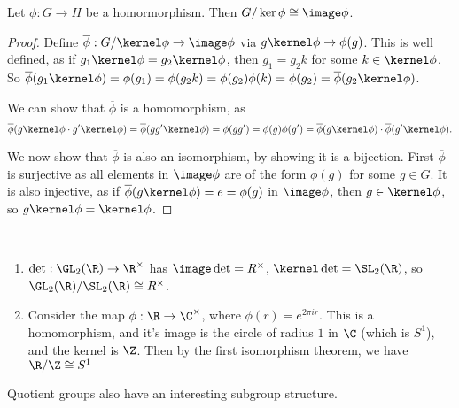 \documentclass[a4]{scrreprt}
\begin{document}
\begin{theorem}
	Let $\phi : G \rightarrow H$ be a homormorphism. Then $G/\ker \phi \cong \image \phi$.
\end{theorem}
\begin{proof}
	Define $\overline{\phi} : G/\kernel \phi \rightarrow \image \phi$ via $g \kernel \phi \rightarrow \phi(g)$.
	This is well defined, as if $g_1 \kernel \phi = g_2 \kernel \phi$, then $g_1 = g_2k$ for some $k \in \kernel \phi$. So $\overline{\phi}(g_1 \kernel \phi) = \phi(g_1) = \phi(g_2 k) = \phi(g_2) \phi(k) = \phi(g_2) = \overline{\phi}(g_2 \kernel \phi)$.

	We can show that $\overline{\phi}$ is a homomorphism, as 
	$$
	\overline{\phi}(g \kernel \phi \cdot g' \kernel \phi) = \overline{\phi}(g g' \kernel \phi) = \phi(g g') = \phi(g) \phi(g') = \overline{\phi}(g \kernel \phi) \cdot \overline{\phi}(g' \kernel \phi).
	$$

	We now show that $\overline{\phi}$ is also an isomorphism, by showing it is a bijection. First $\overline{\phi}$ is surjective as all elements in $\image \phi$ are of the form $\phi(g)$ for some $g \in G$. It is also injective, as if $\overline{\phi}(g \kernel \phi) = e = \phi(g)$ in $\image \phi$, then $g \in \kernel \phi$, so $g \kernel \phi = \kernel \phi$.
\end{proof}

\begin{example}~
    \vspace*{-1.5\baselineskip}
\begin{enumerate}[label=(\roman*)]
    \item $\det : \GL_2(\R) \rightarrow \R^\times$ has $\image \det = R^\times$, $\kernel \det = \SL_2(\R)$, so $\GL_2(\R) / \SL_2(\R) \cong R^\times$.
    \item Consider the map $\phi : \R \rightarrow \C^\times$, where $\phi(r) = e^{2 \pi i r}$. This is a homomorphism, and it's image is the circle of radius $1$ in $\C$ (which is $S^1$), and the kernel is $\Z$. Then by the first isomorphism theorem, we have $\R/\Z \cong S^1$
\end{enumerate}
\end{example}

Quotient groups also have an interesting subgroup structure.
\end{document}
